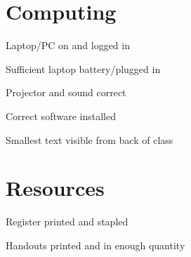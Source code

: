 \documentclass[a4paper]{article}
\newenvironment{checklist}{%
    \begin{list}{}{}%
    \let\olditem\item
    \renewcommand\item{\olditem[$\Box$] }
}{%
    \end{list}
}
\begin{document}
    \section{Computing}
        \begin{checklist}
            \item Laptop/PC on and logged in
            \item Sufficient laptop battery/plugged in
            \item Projector and sound correct
            \item Correct software installed
            \item Smallest text visible from back of class
        \end{checklist}
    \section{Resources}
        \begin{checklist}
            \item Register printed and stapled
            \item Handouts printed and in enough quantity
        \end{checklist}
\end{document}
